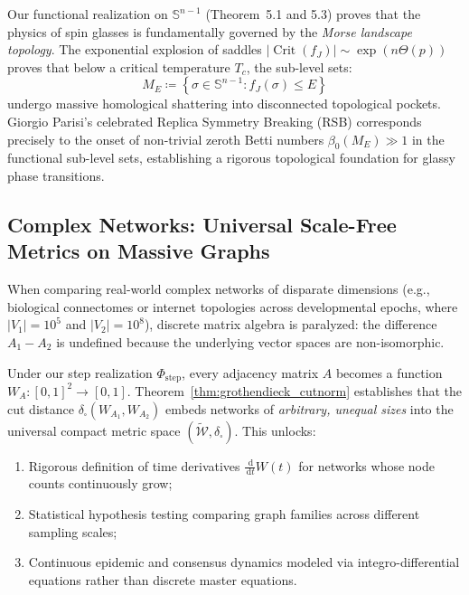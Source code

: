 \documentclass[11pt,a4paper,reqno]{amsart}
\theoremstyle{definition}
\numberwithin{equation}{section}
\newcommand{\Sph}{\mathbb{S}}
\newcommand{\dif}{\,\mathrm{d}}
\begin{document}
Our functional realization on $\Sph^{n-1}$ (Theorem~5.1 and 5.3) proves that the physics of spin glasses is fundamentally governed by the \emph{Morse landscape topology}. The exponential explosion of saddles $|\operatorname{Crit}(f_J)| \sim \exp(n \Theta(p))$ proves that below a critical temperature $T_c$, the sub-level sets:
\begin{equation}
    M_E \coloneqq \left\{ \sigma \in \Sph^{n-1} \colon f_J(\sigma) \le E \right\}
\end{equation}
undergo massive homological shattering into disconnected topological pockets. Giorgio Parisi's celebrated Replica Symmetry Breaking (RSB) corresponds precisely to the onset of non-trivial zeroth Betti numbers $\beta_0(M_E) \gg 1$ in the functional sub-level sets, establishing a rigorous topological foundation for glassy phase transitions.

\subsection{Complex Networks: Universal Scale-Free Metrics on Massive Graphs}
\label{subsec:imp_networks}
When comparing real-world complex networks of disparate dimensions (e.g., biological connectomes or internet topologies across developmental epochs, where $|V_1| = 10^5$ and $|V_2| = 10^8$), discrete matrix algebra is paralyzed: the difference $A_1 - A_2$ is undefined because the underlying vector spaces are non-isomorphic.

Under our step realization $\Phi_{\mathrm{step}}$, every adjacency matrix $A$ becomes a function $W_A \colon [0, 1]^2 \to [0, 1]$. Theorem~\ref{thm:grothendieck_cutnorm} establishes that the cut distance $\delta_\square(W_{A_1}, W_{A_2})$ embeds networks of \emph{arbitrary, unequal sizes} into the universal compact metric space $(\widetilde{\mathcal{W}}, \delta_\square)$. This unlocks:
\begin{enumerate}[label=(\roman*)]
    \item Rigorous definition of time derivatives $\frac{\dif}{\dif t} W(t)$ for networks whose node counts continuously grow;
    \item Statistical hypothesis testing comparing graph families across different sampling scales;
    \item Continuous epidemic and consensus dynamics modeled via integro-differential equations rather than discrete master equations.
\end{enumerate}
\end{document}
